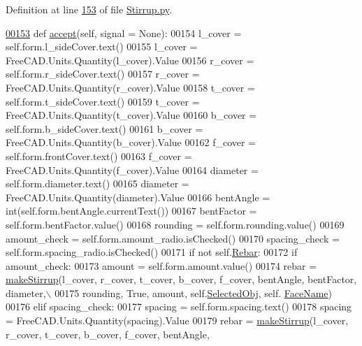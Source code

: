 Definition at line \hyperlink{Stirrup_8py_source_l00153}{153} of file \hyperlink{Stirrup_8py_source}{Stirrup.\+py}.


\begin{DoxyCode}
\hypertarget{classStirrup_1_1__StirrupTaskPanel.tex_l00153}{}\hyperlink{classStirrup_1_1__StirrupTaskPanel_a49957596860a74388ec2e64535eacbc6}{00153}     \textcolor{keyword}{def }\hyperlink{classStirrup_1_1__StirrupTaskPanel_a49957596860a74388ec2e64535eacbc6}{accept}(self, signal = None):
00154         l\_cover = self.form.l\_sideCover.text()
00155         l\_cover = FreeCAD.Units.Quantity(l\_cover).Value
00156         r\_cover = self.form.r\_sideCover.text()
00157         r\_cover = FreeCAD.Units.Quantity(r\_cover).Value
00158         t\_cover = self.form.t\_sideCover.text()
00159         t\_cover = FreeCAD.Units.Quantity(t\_cover).Value
00160         b\_cover = self.form.b\_sideCover.text()
00161         b\_cover = FreeCAD.Units.Quantity(b\_cover).Value
00162         f\_cover = self.form.frontCover.text()
00163         f\_cover = FreeCAD.Units.Quantity(f\_cover).Value
00164         diameter = self.form.diameter.text()
00165         diameter = FreeCAD.Units.Quantity(diameter).Value
00166         bentAngle = int(self.form.bentAngle.currentText())
00167         bentFactor = self.form.bentFactor.value()
00168         rounding = self.form.rounding.value()
00169         amount\_check = self.form.amount\_radio.isChecked()
00170         spacing\_check = self.form.spacing\_radio.isChecked()
00171         \textcolor{keywordflow}{if} \textcolor{keywordflow}{not} self.\hyperlink{classStirrup_1_1__StirrupTaskPanel_a004a341f992f38ca54893edf92f85faa}{Rebar}:
00172             \textcolor{keywordflow}{if} amount\_check:
00173                 amount = self.form.amount.value()
00174                 rebar = \hyperlink{namespaceStirrup_a705fc121e2af9c8ac05eb299f4fb9f2f}{makeStirrup}(l\_cover, r\_cover, t\_cover, b\_cover, f\_cover, bentAngle, 
      bentFactor, diameter,\(\backslash\)
00175                     rounding, \textcolor{keyword}{True}, amount, self.\hyperlink{classStirrup_1_1__StirrupTaskPanel_a25d8b984bd2817ec46c1375b6bec647d}{SelectedObj}, self.
      \hyperlink{classStirrup_1_1__StirrupTaskPanel_a8c01c4e8108c6aaad15394072b188730}{FaceName})
00176             \textcolor{keywordflow}{elif} spacing\_check:
00177                 spacing = self.form.spacing.text()
00178                 spacing = FreeCAD.Units.Quantity(spacing).Value
00179                 rebar = \hyperlink{namespaceStirrup_a705fc121e2af9c8ac05eb299f4fb9f2f}{makeStirrup}(l\_cover, r\_cover, t\_cover, b\_cover, f\_cover, bentAngle, 

\end{DoxyCode}
